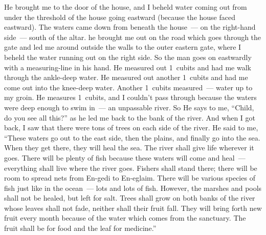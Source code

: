 
\begin{inparaenum}
   He brought me to the door of the house, and I beheld%
  water coming out from under the threshold of the house going eastward (because the house faced eastward).%
  The waters came down from beneath the house~--- on the right-hand side~--- south of the altar.%
    he brought me out on the road which goes through the gate and led me around outside the walls to the outer%
  eastern gate, where I beheld%
  the water running out on the right side.%
   So the man goes on eastwardly with a measuring-line in his hand. He measured out 1~cubits and had me walk through the ankle-deep water.%
   He  measured out another 1~cubits and had me come out into the knee-deep water. Another 1~cubits measured~--- water up to my groin.%
   He measures 1~cubits, and I couldn't pass through because the waters were deep enough to swim in~--- an unpassable river.%
   So He says to me, ``Child,%
  do you see all this?'' as he led me back to the bank of the river.%
   And when I got back, I saw that there were tons of trees on each side of the river.%
   He  said to me, ``These waters go out to the east side, then the plains, and finally go into the sea. When they get there, they will heal the sea.%
   The river shall give life wherever it goes. There will be plenty of fish because these waters will come and heal~--- everything shall live where the river goes.%
   Fishers shall stand there;%
  there will be room to spread nets from En-gedi to En-eglaim. There will be various species of fish just like in the ocean~--- lots and lots of fish.%
   However, the marshes and pools shall not be healed, but left for salt.%
   Trees shall grow on both banks of the river whose leaves shall not fade, neither shall their fruit fall. They will bring forth new fruit every month because of the water which comes from the sanctuary. The fruit shall be for food and the leaf for medicine.''%
\end{inparaenum}
